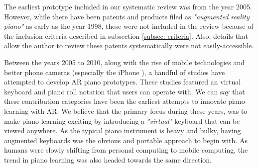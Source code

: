\documentclass[sigchi, review]{acmart}
\begin{document}
The earliest prototype included in our systematic review was from the year 2005. However, while there have been patents and products filed as \textit{"augmented reality piano"} as early as the year 1998, these were not included in the review because of the inclusion criteria described in subsection \ref{subsec: criteria}. Also, details that allow the author to review these patents systematically were not easily-accessible.

Between the years 2005 to 2010, along with the rise of mobile technologies and better phone cameras (especially the iPhone \cite{querashi2012apple}), a handful of studies have attempted to develop AR piano prototypes. These studies featured an virtual keyboard and piano roll notation that users can operate with. We can say that these contribution categories have been the earliest attempts to innovate piano learning with AR. We believe that the primary focus during these years, was to make piano learning exciting by introducing a \textit{"virtual"} keyboard that can be viewed anywhere. As the typical piano instrument is heavy and bulky, having augmented keyboards was the obvious and portable approach to begin with. As humans were slowly shifting from personal computing to mobile computing, the trend in piano learning was also headed towards the same direction.
\end{document}
